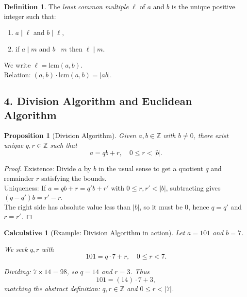 \documentclass[12pt]{article}
\newtheorem{proposition}[theorem]{Proposition}
\newtheorem{calculative}[theorem]{Calculative}
\theoremstyle{definition}
\newtheorem{definition}{Definition}
\begin{document}
\dotfill

\begin{definition}
The \emph{least common multiple} $\ell$ of $a$ and $b$ is the unique positive integer such that:
\begin{enumerate}
    \item $a\mid \ell$ and $b\mid \ell$,
    \item if $a\mid m$ and $b\mid m$ then $\ell\mid m$.
\end{enumerate}

\noindent
We write $\ell = \mathrm{lcm}(a,b)$. \\

\noindent
Relation: $(a,b)\cdot \mathrm{lcm}(a,b) = |ab|$.
\end{definition}

\newpage

\subsection*{4. Division Algorithm and Euclidean Algorithm}

\begin{proposition}[Division Algorithm]
Given $a,b\in\mathbb{Z}$ with $b\neq 0$, there exist unique $q,r\in\mathbb{Z}$ such that
\[
a = qb + r,\quad 0 \le r < |b|.
\]
\end{proposition}

\vspace{1em}

\begin{proof}
Existence: Divide $a$ by $b$ in the usual sense to get a quotient $q$ and remainder $r$ satisfying the bounds.\\

\noindent
Uniqueness: If $a = qb + r = q'b + r'$ with $0\le r,r'<|b|$, subtracting gives $(q-q')b = r'-r$.\\

\noindent
The right side has absolute value less than $|b|$, so it must be $0$, hence $q=q'$ and $r=r'$.
\end{proof}

\dotfill

\begin{calculative}[Example: Division Algorithm in action]
Let $a=101$ and $b=7$. 

\noindent
We seek $q,r$ with
\[
101 = q\cdot 7 + r, \quad 0 \le r < 7.
\]

\noindent
Dividing: $7\times 14 = 98$, so $q=14$ and $r=3$. Thus
\[
101 = (14)\cdot 7 + 3,
\]
matching the abstract definition: $q,r\in\mathbb{Z}$ and $0\le r < |7|$.
\end{calculative}
\end{document}
